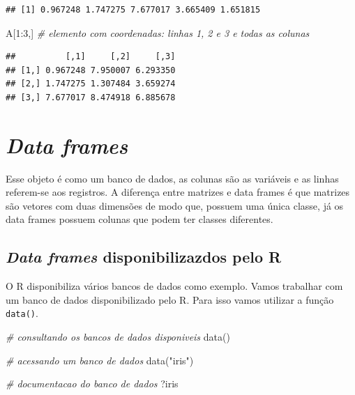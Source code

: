 \documentclass[
]{book}
\newenvironment{Shaded}{\begin{snugshade}}{\end{snugshade}}
\newcommand{\CommentTok}[1]{\textcolor[rgb]{0.56,0.35,0.01}{\textit{#1}}}
\newcommand{\DecValTok}[1]{\textcolor[rgb]{0.00,0.00,0.81}{#1}}
\newcommand{\FunctionTok}[1]{\textcolor[rgb]{0.00,0.00,0.00}{#1}}
\newcommand{\NormalTok}[1]{#1}
\newcommand{\SpecialCharTok}[1]{\textcolor[rgb]{0.00,0.00,0.00}{#1}}
\newcommand{\StringTok}[1]{\textcolor[rgb]{0.31,0.60,0.02}{#1}}
\begin{document}
\begin{verbatim}
## [1] 0.967248 1.747275 7.677017 3.665409 1.651815
\end{verbatim}

\begin{Shaded}
\begin{Highlighting}[]
\NormalTok{A[}\DecValTok{1}\SpecialCharTok{:}\DecValTok{3}\NormalTok{,] }\CommentTok{\# elemento com coordenadas: linhas 1, 2 e 3 e todas as colunas}
\end{Highlighting}
\end{Shaded}

\begin{verbatim}
##          [,1]     [,2]     [,3]
## [1,] 0.967248 7.950007 6.293350
## [2,] 1.747275 1.307484 3.659274
## [3,] 7.677017 8.474918 6.885678
\end{verbatim}

\hypertarget{data-frames}{%
\section{\texorpdfstring{\emph{Data frames}}{Data frames}}\label{data-frames}}

Esse objeto é como um banco de dados, as colunas são as variáveis e as linhas referem-se aos registros. A diferença entre matrizes e data frames é que matrizes são vetores com duas dimensões de modo que, possuem uma única classe, já os data frames possuem colunas que podem ter classes diferentes.

\hypertarget{data-frames-disponibilizazdos-pelo-r}{%
\subsection{\texorpdfstring{\emph{Data frames} disponibilizazdos pelo R}{Data frames disponibilizazdos pelo R}}\label{data-frames-disponibilizazdos-pelo-r}}

O R disponibiliza vários bancos de dados como exemplo. Vamos trabalhar com um banco de dados disponibilizado pelo R. Para isso vamos utilizar a função \texttt{data()}.

\begin{Shaded}
\begin{Highlighting}[]
\CommentTok{\# consultando os bancos de dados disponiveis}
\FunctionTok{data}\NormalTok{()}

\CommentTok{\# acessando um banco de dados}
\FunctionTok{data}\NormalTok{(}\StringTok{"iris"}\NormalTok{)}

\CommentTok{\# documentacao do banco de dados}
\NormalTok{?iris}
\end{Highlighting}
\end{Shaded}
\end{document}
